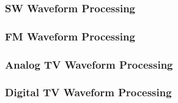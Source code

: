 \KNEADSUBSUBSECTIONNEWPAGE
\subsubsection{SW Waveform Processing}
\label{lloc:Waveform_Processing_SW}
\renewcommand{\ThisSegment}{\SW Waveform Processing\xspace}%


\KNEADSUBSUBSECTIONNEWPAGE
\subsubsection{FM Waveform Processing}
\label{lloc:Waveform_Processing_FM}
\renewcommand{\ThisSegment}{\FM Waveform Processing\xspace}%


\KNEADSUBSUBSECTIONNEWPAGE
\subsubsection{Analog TV Waveform Processing}
\label{lloc:Waveform_Processing_ATV}
\renewcommand{\ThisSegment}{\ATV Waveform Processing\xspace}%


\KNEADSUBSUBSECTIONNEWPAGE
\subsubsection{Digital TV Waveform Processing}
\label{lloc:Waveform_Processing_DTV}
\renewcommand{\ThisSegment}{\DTV Waveform Processing\xspace}%


